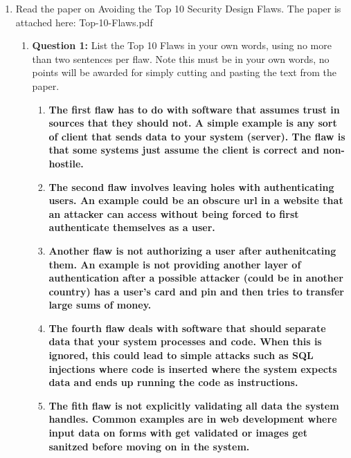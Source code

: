 \documentclass[12pt]{article}
\begin{document}
\renewcommand{\headrulewidth}{0.4pt}
\vspace{-3mm}
\begin{enumerate}
\item Read the paper on Avoiding the Top 10 Security Design Flaws.  The paper is attached here: Top-10-Flaws.pdf
\begin{enumerate}
  \item \textbf{Question 1:} List the Top 10 Flaws in your own words, using no more than two sentences per flaw. Note this must be in your own words, no points will be awarded for simply cutting and pasting the text from the paper. \\

  \begin{enumerate}
    \item \textbf{The first flaw has to do with software that assumes trust in sources that they should not. A simple example is any sort of client that sends data to your system (server). The flaw is that some systems just assume the client is correct and non-hostile.} \\

    \item \textbf{The second flaw involves leaving holes with authenticating users. An example could be an obscure url in a website that an attacker can access without being forced to first authenticate themselves as a user.} \\

    \item \textbf{Another flaw is not authorizing a user after authenitcating them. An example is not providing another layer of authentication after a possible attacker (could be in another country) has a user's card and pin and then tries to transfer large sums of money.} \\

    \item \textbf{The fourth flaw deals with software that should separate data that your system processes and code. When this is ignored, this could lead to simple attacks such as SQL injections where code is inserted where the system expects data and ends up running the code as instructions.} \\

    \item \textbf{The fith flaw is not explicitly validating all data the system handles. Common examples are in web development where input data on forms with get validated or images get sanitzed before moving on in the system.} \\


\end{enumerate}
\end{enumerate}
\end{enumerate}
\end{document}
